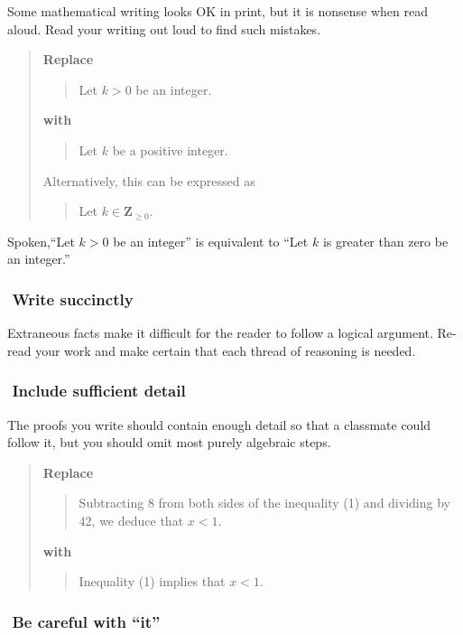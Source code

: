 \documentclass[12pt]{article}
\newcounter{ex}\setcounter{ex}{0}
\newcommand{\ex}{%
\hspace{-0.2in} \setcounter{ex}{\value{ex}+1}
\theex \,\,}
\newcounter{id}\setcounter{id}{0}
\newcounter{se}\setcounter{se}{0}
\begin{document}
Some mathematical writing looks OK in print, but it is nonsense when read
aloud.  Read your writing out loud to find such mistakes.

\begin{quote}
\textbf{Replace}
\begin{quote}
  Let \(k > 0\) be an integer.
\end{quote}
\textbf{with}
\begin{quote}
  Let \(k\) be a positive integer.
\end{quote}
Alternatively,  this can be expressed as
\begin{quote}
  Let \(k \in \mathbf{Z}_ {\geq 0}.\)
\end{quote}
\end{quote}
Spoken,``Let \(k > 0\) be an integer'' is equivalent to
``Let \(k\) is greater than zero  be an integer.''



\subsubsection*{\ex  Write succinctly}  

Extraneous facts make it difficult for the reader to follow a logical
argument.  Re-read your work and make certain that each thread of
reasoning is needed.

\subsubsection*{\ex  Include sufficient detail}  

The proofs you write should contain enough detail so that a 
classmate could  follow it, but you should omit most purely algebraic 
steps. 

\begin{quote}
\textbf{Replace}
\begin{quote}
Subtracting 8 from both sides of the inequality (1)  and dividing by 42,
we deduce that \(x < 1\).
\end{quote}
\textbf{with}
\begin{quote}
Inequality (1) implies that \(x < 1\).
\end{quote}
\end{quote}

\subsubsection*{\ex Be careful with ``it''}
\end{document}
